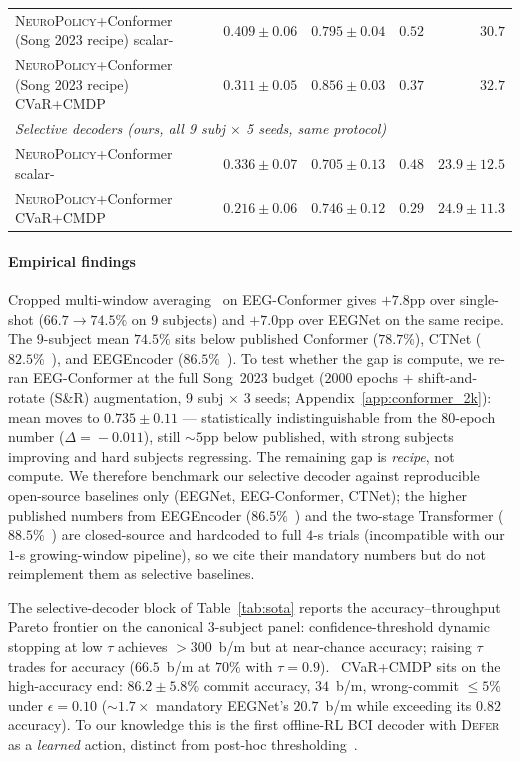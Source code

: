 \begin{table}[!htbp]
\begin{tabular}{l r r r r}
\textsc{NeuroPolicy}+Conformer (Song 2023 recipe) scalar-\cql{} & $0.409 \!\pm\! 0.06$ & $0.795 \!\pm\! 0.04$ & $0.52$ & $30.7$ \\
\textsc{NeuroPolicy}+Conformer (Song 2023 recipe) CVaR+CMDP   & $0.311 \!\pm\! 0.05$ & $0.856 \!\pm\! 0.03$ & $0.37$ & $32.7$ \\
\midrule
\multicolumn{5}{l}{\textit{Selective decoders (ours, all 9 subj $\times$ 5 seeds, same protocol)}} \\
\textsc{NeuroPolicy}+Conformer scalar-\cql{}    & $0.336 \!\pm\! 0.07$ & $0.705 \!\pm\! 0.13$ & $0.48$ & $23.9 \!\pm\! 12.5$ \\
\textsc{NeuroPolicy}+Conformer CVaR+CMDP        & $0.216 \!\pm\! 0.06$ & $0.746 \!\pm\! 0.12$ & $0.29$ & $24.9 \!\pm\! 11.3$ \\
\bottomrule
\end{tabular}
\end{table}

\paragraph*{Empirical findings}
Cropped multi-window averaging~\cite{Schirrmeister2017DeepLearning}
on EEG-Conformer gives $+7.8$pp over single-shot
($66.7\!\to\!74.5\%$ on 9 subjects) and $+7.0$pp over EEGNet on
the same recipe. The 9-subject mean $74.5\%$ sits below published
Conformer ($78.7\%$), CTNet ($82.5\%$~\cite{Zhao2024CTNet}), and
EEGEncoder ($86.5\%$~\cite{Liao2025EEGEncoder}). To test whether
the gap is compute, we re-ran EEG-Conformer at the full
Song~2023 budget ($2000$ epochs + shift-and-rotate (S\&R)
augmentation, 9 subj $\times$ 3
seeds; Appendix~\ref{app:conformer_2k}): mean moves to
$0.735\!\pm\!0.11$ --- statistically indistinguishable from the
$80$-epoch number ($\Delta\!=\!-0.011$), still $\sim\!5$pp
below published, with strong subjects improving and hard subjects
regressing. The remaining gap is \emph{recipe}, not compute. We
therefore benchmark our selective decoder against reproducible
open-source baselines only (EEGNet, EEG-Conformer, CTNet); the
higher published numbers from EEGEncoder
($86.5\%$~\cite{Liao2025EEGEncoder}) and the two-stage Transformer
($88.5\%$~\cite{Chaudhary2024TwoStageMI}) are closed-source and
hardcoded to full $4$-s trials (incompatible with our $1$-s
growing-window pipeline), so we cite their mandatory numbers but
do not reimplement them as selective baselines.

The selective-decoder block of Table~\ref{tab:sota} reports the
accuracy--throughput Pareto frontier on the canonical 3-subject
panel: confidence-threshold dynamic stopping at low $\tau$
achieves $\!>\!300$~b/m but at near-chance accuracy; raising
$\tau$ trades \itr{} for accuracy ($66.5$~b/m at $70\%$ with
$\tau\!=\!0.9$). \nettype{}~CVaR+CMDP sits on the high-accuracy
end: $86.2\!\pm\!5.8\%$ commit accuracy, $34$~b/m, wrong-commit
$\le 5\%$ under $\epsilon\!=\!0.10$ ($\sim\!1.7\times$ mandatory
EEGNet's $20.7$~b/m while exceeding its $0.82$ accuracy). To our
knowledge this is the first offline-RL BCI decoder with
\textsc{Defer} as a \emph{learned} action, distinct from post-hoc
thresholding~\cite{Ganeshkumar2017RejectMI}.

